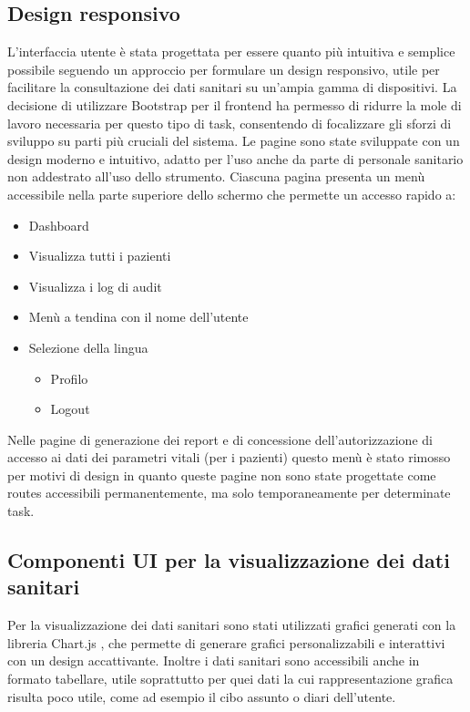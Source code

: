 \documentclass[12pt,a4paper,oneside]{report}
\begin{document}
\subsection{Design responsivo}
L'interfaccia utente è stata progettata per essere quanto più intuitiva e semplice possibile seguendo un approccio per formulare un design responsivo, utile per facilitare la consultazione dei dati sanitari su un'ampia gamma di dispositivi.
La decisione di utilizzare Bootstrap per il frontend ha permesso di ridurre la mole di lavoro necessaria per questo tipo di task, consentendo di focalizzare gli sforzi di sviluppo su parti più cruciali del sistema.
Le pagine sono state sviluppate con un design moderno e intuitivo, adatto per l'uso anche da parte di personale sanitario non addestrato all'uso dello strumento.
Ciascuna pagina presenta un menù accessibile nella parte superiore dello schermo che permette un accesso rapido a:
\begin{itemize}
    \item Dashboard
    \item Visualizza tutti i pazienti
    \item Visualizza i log di audit
    \item Menù a tendina con il nome dell'utente
    \item Selezione della lingua
          \begin{itemize}
              \item Profilo
              \item Logout
          \end{itemize}
\end{itemize}
Nelle pagine di generazione dei report e di concessione dell'autorizzazione di accesso ai dati dei parametri vitali (per i pazienti) questo menù è stato rimosso per motivi di design in quanto queste pagine non sono state progettate come routes accessibili permanentemente, ma solo temporaneamente per determinate task.
\subsection{Componenti UI per la visualizzazione dei dati sanitari}
Per la visualizzazione dei dati sanitari sono stati utilizzati grafici generati con la libreria Chart.js \cite{chartjs}, che permette di generare grafici personalizzabili e interattivi con un design accattivante.
Inoltre i dati sanitari sono accessibili anche in formato tabellare, utile soprattutto per quei dati la cui rappresentazione grafica risulta poco utile, come ad esempio il cibo assunto o diari dell'utente.
\end{document}
